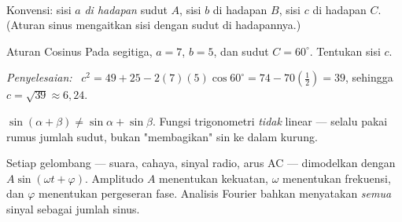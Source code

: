\documentclass[11pt,a4paper]{report}
\theoremstyle{gaya}
\newcommand{\jawab}{\par\smallskip\noindent\textit{\textcolor{oranye}{Penyelesaian:}}\ }
\begin{document}
\begin{center}
\\
\small Konvensi: sisi $a$ \emph{di hadapan} sudut $A$, sisi $b$ di hadapan $B$, sisi $c$ di hadapan $C$. (Aturan sinus mengaitkan sisi dengan sudut di hadapannya.)
\end{center}

\begin{contoh}{Aturan Cosinus}
Pada segitiga, $a=7$, $b=5$, dan sudut $C=60^\circ$. Tentukan sisi $c$.

\jawab
$c^2 = 49 + 25 - 2(7)(5)\cos60^\circ = 74 - 70(\tfrac12) = 39$,
sehingga $c=\sqrt{39}\approx6{,}24$.
\end{contoh}

\begin{kesalahan}
$\sin(\alpha+\beta)\neq\sin\alpha+\sin\beta$. Fungsi trigonometri \emph{tidak} linear --- selalu pakai rumus jumlah sudut, bukan "membagikan" sin ke dalam kurung.
\end{kesalahan}

\begin{dunianyata}
Setiap gelombang --- suara, cahaya, sinyal radio, arus AC --- dimodelkan dengan $A\sin(\omega t+\varphi)$. Amplitudo $A$ menentukan kekuatan, $\omega$ menentukan frekuensi, dan $\varphi$ menentukan pergeseran fase. Analisis Fourier bahkan menyatakan \emph{semua} sinyal sebagai jumlah sinus.
\end{dunianyata}
\end{document}
